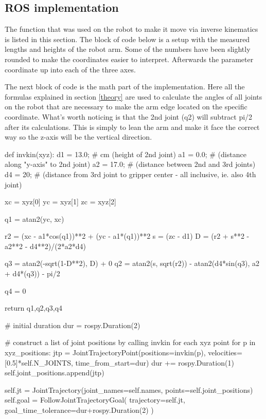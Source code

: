 \subsection{ROS implementation}
The function that was used on the robot to make it move via inverse kinematics is listed in this section. The block of code below is a setup with the measured lengths and heights of the robot arm. Some of the numbers have been slightly rounded to make the coordinates easier to interpret. Afterwards the parameter coordinate up into each of the three axes.

The next block of code is the math part of the implementation. Here all the formulas explained in section \ref{theory} are used to calculate the angles of all joints on the robot that are necessary to make the arm edge located on the specific coordinate. What's worth noticing is that the 2nd joint (q2) will subtract pi/2 after its calculations. This is simply to lean the arm and make it face the correct way so the z-axis will be the vertical direction.

\begin{pyminted}
def invkin(xyz):
	d1 = 13.0; # cm (height of 2nd joint)
	a1 = 0.0; # (distance along "y-axis" to 2nd joint)
	a2 = 17.0; # (distance between 2nd and 3rd joints)
	d4 = 20; # (distance from 3rd joint to gripper center - all inclusive, ie. also 4th joint)

	xc = xyz[0]
	yc = xyz[1]
	zc = xyz[2]

	q1 = atan2(yc, xc)

	r2 = (xc - a1*cos(q1))**2 + (yc - a1*\sin(q1))**2
	s = (zc - d1)
	D = (r2 + s**2 - a2**2 - d4**2)/(2*a2*d4)

	q3 = atan2(-sqrt(1-D**2), D) + 0
	q2 = atan2(s, sqrt(r2)) - atan2(d4*sin(q3), a2 + d4*\cos(q3)) - pi/2

	q4 = 0

	return q1,q2,q3,q4
\end{pyminted}

\begin{pyminted}
# initial duration
dur = rospy.Duration(2)

# construct a list of joint positions by calling invkin for each xyz point
for p in xyz_positions:
	jtp = JointTrajectoryPoint(positions=invkin(p), velocities=[0.5]*self.N_JOINTS, time_from_start=dur)
	dur += rospy.Duration(1)
	self.joint_positions.append(jtp)

self.jt = JointTrajectory(joint_names=self.names, points=self.joint_positions)
self.goal = FollowJointTrajectoryGoal( trajectory=self.jt, goal_time_tolerance=dur+rospy.Duration(2) )
\end{pyminted}

